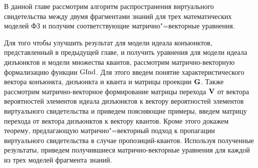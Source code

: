 В данной главе рассмотрим алгоритм распространения виртуального свидетельства между двумя фрагментами знаний для трех математических моделей ФЗ и получим соответствующие матрично"=векторные уравнения. 

Для того чтобы улучшить результат для модели идеала конъюнктов, представленный в предыдущей главе, и получить уравнения для модели идеала дизъюнктов и модели множества квантов, рассмотрим матрично-векторную формализацию функции $\mathrm{GInd}$. Для этого введем понятие характеристического вектора конъюнкта, дизъюнкта и кванта и матрицы проекции $\mathbf{G}$. Также рассмотрим матрично-векторное формирование матрицы перехода $\mathbf{V}$ от вектора вероятностей элементов идеала дизъюнктов к вектору вероятностей элементов виртуального свидетельства и приведем поясняющие примеры, введем матрицу перехода от вектора дизъюнктов к вектору квантов. Кроме этого докажем теорему, предлагающую матрично"=векторный подход к пропагации виртуального свидетельства в случае пропозиций-квантов. Используя полученные результаты, приведем получившиеся матрично-векторные уравнения для каждой из трех моделей фрагмента знаний. 